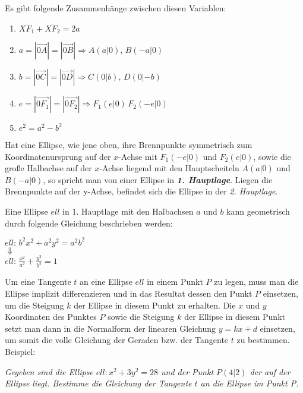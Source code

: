 Es gibt folgende Zusammenh\"{a}nge zwischen diesen Variablen:

\begin{enumerate}
	\item $\overbar{XF_{1}} + \overbar{XF_{2}} = 2a$
	\item $a = |\vec{0A}| = |\vec{0B}| \Rightarrow A (a | 0),\, B (-a | 0)$
	\item $b = |\vec{0C}| = |\vec{0D}| \Rightarrow C (0 | b),\, D (0 | -b)$
	\item $e = |\vec{0F_{1}}| = |\vec{0F_{2}}| \Rightarrow F_{1} (e | 0)\, F_{2} (-e | 0)$
	\item $e^2 = a^2 - b^2$
\end{enumerate}

Hat eine Ellipse, wie jene oben, ihre Brennpunkte symmetrisch zum Koordinatenursprung auf der $x$-Achse mit $F_{1} (-e | 0)$ und $F_{2} (e | 0)$, sowie die gro\ss{}e Halbachse auf der $x$-Achse liegend mit den Hauptscheiteln $A (a | 0) $ und $B (-a | 0)$, so spricht man von einer Ellipse in \textbf{\emph{1. Hauptlage}}. Liegen die Brennpunkte auf der y-Achse, befindet sich die Ellipse in der \emph{2. Hauptlage}. 

\pagebreak

Eine Ellipse $ell$ in 1. Hauptlage mit den Halbachsen $a$ und $b$ kann geometrisch durch folgende Gleichung beschrieben werden:

\begin{table}[h!]
	\begin{center}
		$ell:\, b^2x^2 + a^2y^2 = a^2b^2$\\
		$\Downarrow$\\
		$ell:\, \frac{x^2}{a^2} + \frac{y^2}{b^2} = 1$
	\end{center}
\end{table}



Um eine Tangente $t$ an eine Ellipse $ell$ in einem Punkt $P$ zu legen, muss man die Ellipse implizit differenzieren und in das Resultat dessen den Punkt $P$ einsetzen, um die Steigung $k$ der Ellipse in diesem Punkt zu erhalten. Die $x$ und $y$ Koordinaten des Punktes $P$ sowie die Steigung $k$ der Ellipse in diesem Punkt setzt man dann in die Normalform der linearen Gleichung $y = kx + d$ einsetzen, um somit die volle Gleichung der Geraden bzw. der Tangente $t$ zu bestimmen. Beispiel:

\emph{Gegeben sind die Ellipse $ell: x^2 + 3y^2 = 28$ und der Punkt $P(4 | 2)$ der auf der Ellipse liegt. Bestimme die Gleichung der Tangente $t$ an die Ellipse im Punkt P.}


